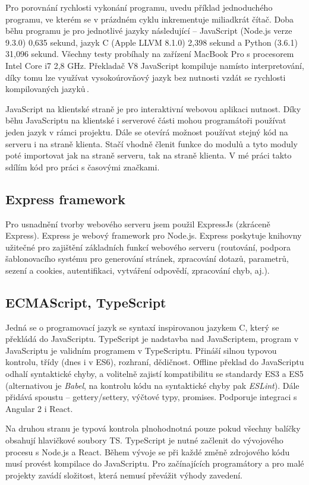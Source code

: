Pro porovnání rychlosti vykonání programu, uvedu příklad jednoduchého programu, ve kterém se v prázdném cyklu inkrementuje miliadkrát čítač. Doba běhu programu je pro jednotlivé jazyky následující -- JavaScript (Node.js verze 9.3.0) 0,635 sekund, jazyk C (Apple LLVM 8.1.0) 2,398 sekund a Python (3.6.1) 31,096 sekund. Všechny testy probíhaly na zařízení MacBook Pro s procesorem Intel Core i7 2,8 GHz. Překladač V8 JavaScript kompiluje namísto interpretování, díky tomu lze využívat vysokoúrovňový jazyk bez nutnosti vzdát se rychlosti kompilovaných jazyků\,\cite{MasteringNodejs}.

JavaScript na klientské straně je pro interaktivní webovou aplikaci nutnost. Díky běhu JavaScriptu na klientské i serverové části mohou programátoři používat jeden jazyk v rámci projektu. Dále se otevírá možnost používat stejný kód na serveru i na straně klienta. Stačí vhodně členit funkce do modulů a tyto moduly poté importovat jak na straně serveru, tak na straně klienta. V mé práci takto sdílím kód pro práci s časovými značkami.

\subsection{Express framework}
Pro usnadnění tvorby webového serveru jsem použil ExpressJs (zkráceně Express). Express je webový framework pro Node.js. Express poskytuje knihovny užitečné pro zajištění základních funkcí webového serveru (routování, podpora šablonovacího systému pro generování stránek, zpracování dotazů, parametrů, sezení a cookies, autentifikaci, vytváření odpovědí, zpracování chyb, aj.).

\subsection{ECMAScript, TypeScript}
Jedná se o programovací jazyk se syntaxí inspirovanou jazykem C, který se překládá do JavaScriptu. TypeScript je nadstavba nad JavaScriptem, program v JavaScriptu je validním programem v TypeScriptu. Přináší silnou typovou kontrolu, třídy (dnes i v ES6), rozhraní, dědičnost. Offline překlad do JavaScriptu odhalí syntaktické chyby, a volitelně zajistí kompatibilitu se standardy ES3 a ES5 (alternativou je \textit{Babel}, na kontrolu kódu na syntaktické chyby pak \textit{ESLint}). Dále přidává spoustu  -- gettery/settery, výčtové typy, promises. Podporuje integraci s Angular 2 i React.

Na druhou stranu je typová kontrola plnohodnotná pouze pokud všechny balíčky obsahují hlavičkové soubory TS. TypeScript je nutné začlenit do vývojového procesu s Node.js a React. Během vývoje se při každé změně zdrojového kódu musí provést kompilace do JavaScriptu. Pro začínajících programátory a pro malé projekty zavádí složitost, která nemusí převážit výhody zavedení.

